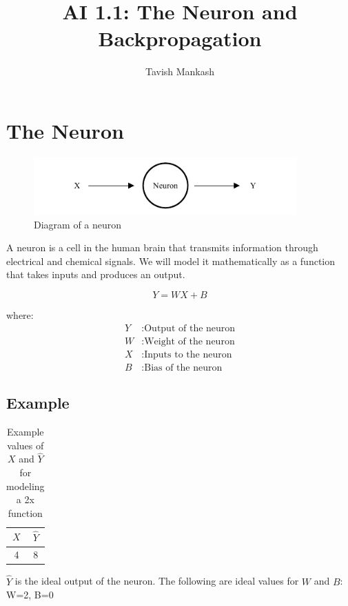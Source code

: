 \documentclass[12pt,a4paper]{article}
\title{AI 1.1: The Neuron and Backpropagation}
\author{Tavish Mankash}
\date{}
\begin{document}
\maketitle

\section{The Neuron}
\begin{figure}[ht]
    \centering
    \includegraphics[width=0.9\textwidth]{../figs/Neuron.drawio.pdf}
    \caption{Diagram of a neuron}
    \label{fig:neuron}
\end{figure}

A neuron is a cell in the human brain that transmits information through electrical and chemical signals. We will model it mathematically as a function that takes inputs and produces an output.

\[
Y = WX + B
\]

where:
\[
\begin{aligned}
    Y & : \text{Output of the neuron} \\
    W & : \text{Weight of the neuron} \\
    X & : \text{Inputs to the neuron} \\
    B & : \text{Bias of the neuron}
\end{aligned}
\]

\subsection{Example}
\begin{table}[ht]
    \centering
    \begin{tabular}{|c|c|}
        \hline
        $X$ & $\hat{Y}$ \\ \hline
        4   & 8         \\ \hline
    \end{tabular}
    \caption{Example values of $X$ and $\hat{Y}$ for modeling a 2x function}
    \label{tab:example}
\end{table}


$\hat{Y}$ is the ideal output of the neuron.
The following are ideal values for $W$ and $B$:
W=2, B=0
\end{document}
